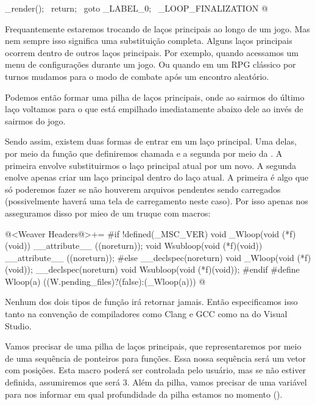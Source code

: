   _render();                                               \
  return;                                                  \
  goto _LABEL_0;                                           \
_LOOP_FINALIZATION
@
\fimcodigo


Frequantemente estaremos trocando de laços principais ao longo de um
jogo. Mas nem sempre isso significa uma substituição completa. Alguns
laços principais ocorrem dentro de outros laços principais. Por
exemplo, quando acessamos um menu de configurações durante um jogo. Ou
quando em um RPG clássico por turnos mudamos para o modo de combate
após um encontro aleatório.

Podemos então formar uma pilha de laços principais, onde ao sairmos do
último laço voltamos para o que está empilhado imediatamente abaixo
dele ao invés de sairmos do jogo.

Sendo assim, existem duas formas de entrar em um laço principal. Uma
delas, por meio da função que definiremos chamada  e
a segunda por meio da . A primeira envolve
substituirmos o laço principal atual por um novo. A segunda enolve
apenas criar um laço principal dentro do laço atual. A primeira é algo
que só poderemos fazer se não houverem arquivos pendentes sendo
carregados (possivelmente haverá uma tela de carregamento neste
caso). Por isso apenas nos asseguramos disso por mieo de um truque com
macros:

\iniciocodigo
@<Weaver Headers@>+=
#if !defined(_MSC_VER)
void _Wloop(void (*f)(void)) __attribute__ ((noreturn));
void Wsubloop(void (*f)(void)) __attribute__ ((noreturn));
#else
__declspec(noreturn) void _Wloop(void (*f)(void));
__declspec(noreturn) void Wsubloop(void (*f)(void));
#endif
#define Wloop(a) ((W.pending_files)?(false):(_Wloop(a)))
@
\fimcodigo

Nenhum dos dois tipos de função irá retornar jamais. Então
especificamos isso tanto na convenção de compiladores como Clang e GCC
como na do Visual Studio.

Vamos precisar de uma pilha de laços principais, que representaremos
por meio de uma sequência de ponteiros para funções. Essa nossa
sequência será um vetor com 
posições. Esta macro poderá ser controlada pelo usuário, mas se não
estiver definida, assumiremos que será 3. Além da pilha, vamos
precisar de uma variável para nos informar em qual profundidade da
pilha estamos no momento (\monoespaco{\_number\_of\_loops}).

